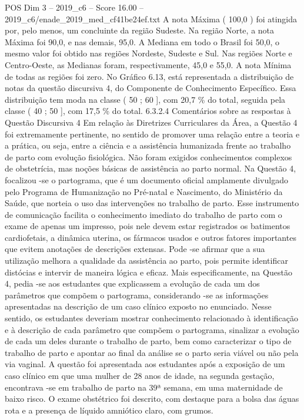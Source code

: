 \begin{textsample}{POS Dim 3 – 2019\_c6 – Score 16.00 – 2019\_c6/enade\_2019\_med\_cf41be24ef.txt}
A nota Máxima ( 100,0 ) foi atingida por, pelo menos, um concluinte da região Sudeste.
Na região Norte, a nota Máxima foi 90,0, e nas demais, 95,0.
A Mediana em todo o Brasil foi 50,0, o mesmo valor foi obtido nas regiões Nordeste, Sudeste e Sul.
Nas regiões Norte e Centro-Oeste, as Medianas foram, respectivamente, 45,0 e 55,0.
A nota Mínima de todas as regiões foi zero.
No Gráfico 6.13, está representada a distribuição de notas da questão discursiva 4, do Componente de Conhecimento Específico.
Essa distribuição tem moda na classe ( 50 ; 60 ], com 20,7 \% do total, seguida pela classe ( 40 ; 50 ], com 17,5 \% do total. 6.3.2.4 Comentários sobre as respostas à Questão Discursiva 4 Em relação às Diretrizes Curriculares da Área, a Questão 4 foi extremamente pertinente, no sentido de promover uma relação entre a teoria e a prática, ou seja, entre a ciência e a assistência humanizada frente ao trabalho de parto com evolução fisiológica.
Não foram exigidos conhecimentos complexos de obstetrícia, mas noções básicas de assistência ao parto normal.
Na Questão 4, focalizou -se o partograma, que é um documento oficial amplamente divulgado pelo Programa de Humanização no Pré-natal e Nascimento, do Ministério da Saúde, que norteia o uso das intervenções no trabalho de parto.
Esse instrumento de comunicação facilita o conhecimento imediato do trabalho de parto com o exame de apenas um impresso, pois nele devem estar registrados os batimentos cardiofetais, a dinâmica uterina, os fármacos usados e outros fatores importantes que evitem anotações de descrições extensas.
Pode -se afirmar que a sua utilização melhora a qualidade da assistência ao parto, pois permite identificar distócias e intervir de maneira lógica e eficaz.
Mais especificamente, na Questão 4, pedia -se aos estudantes que explicassem a evolução de cada um dos parâmetros que compõem o partograma, considerando -se as informações apresentadas na descrição de um caso clínico exposto no enunciado.
Nesse sentido, os estudantes deveriam mostrar conhecimento relacionado à identificação e à descrição de cada parâmetro que compõem o partograma, sinalizar a evolução de cada um deles durante o trabalho de parto, bem como caracterizar o tipo de trabalho de parto e apontar ao final da análise se o parto seria viável ou não pela via vaginal.
A questão foi apresentada aos estudantes após a exposição de um caso clínico em que uma mulher de 28 anos de idade, na segunda gestação, encontrava -se em trabalho de parto na 39ª semana, em uma maternidade de baixo risco.
O exame obstétrico foi descrito, com destaque para a bolsa das águas rota e a presença de líquido amniótico claro, com grumos.

\end{textsample}

